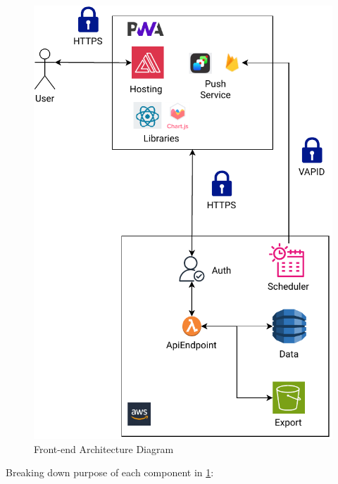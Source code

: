 \begin{figure}
    
    \centering
    \includegraphics[width=\textwidth,height=\textheight,keepaspectratio]{../images/frontend.pdf}
    \caption{Front-end Architecture Diagram}
    \label{fig:frontend}
    
\end{figure}
Breaking down purpose of each component in \ref{fig:frontend}:
